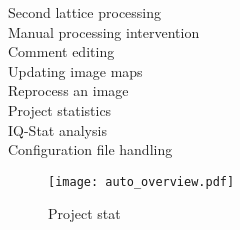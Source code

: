 \begin{description}
	\item [Second lattice processing]
	\item [Manual processing intervention] 
	\item [Comment editing]
	\item [Updating image maps]
	\item [Reprocess an image]
	\item [Project statistics]
	\item [IQ-Stat analysis]
	\item [Configuration file handling] 
\end{description}



\begin{figure}
	\centering
	\texttt{[image: auto\_overview.pdf]}
	\caption{Project stat}
	\label{fig:auto_stat}
\end{figure}
